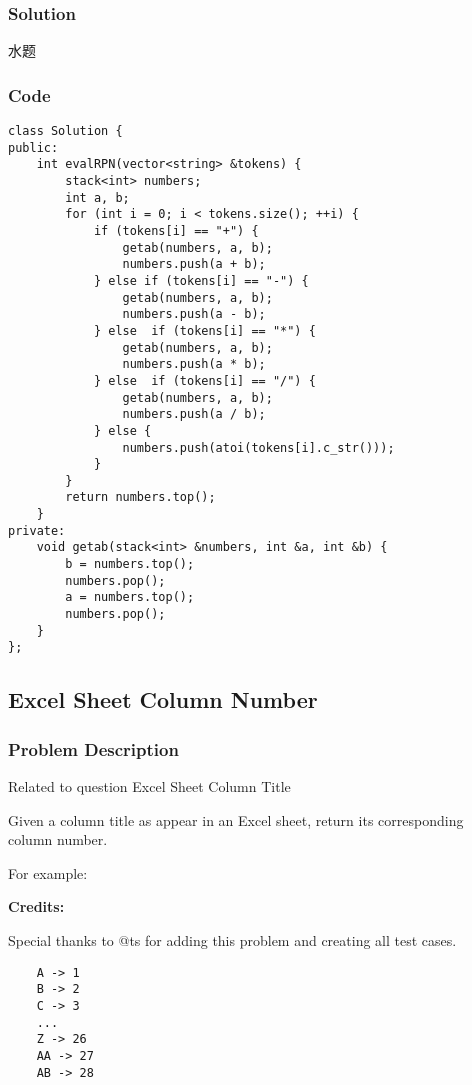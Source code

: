 \documentclass[courier]{article}
\begin{document}
\begin{CJK*}{UTF8}{gkai}
\subsubsection*{Solution}
水题

\subsubsection*{Code}
\begin{lstlisting}
class Solution {
public:
    int evalRPN(vector<string> &tokens) {
        stack<int> numbers;
        int a, b;
        for (int i = 0; i < tokens.size(); ++i) {
            if (tokens[i] == "+") {
                getab(numbers, a, b);
                numbers.push(a + b);
            } else if (tokens[i] == "-") {
                getab(numbers, a, b);
                numbers.push(a - b);
            } else  if (tokens[i] == "*") {
                getab(numbers, a, b);
                numbers.push(a * b);
            } else  if (tokens[i] == "/") {
                getab(numbers, a, b);
                numbers.push(a / b);
            } else {
                numbers.push(atoi(tokens[i].c_str()));
            }
        }
        return numbers.top();
    }
private:
    void getab(stack<int> &numbers, int &a, int &b) {
        b = numbers.top();
        numbers.pop();
        a = numbers.top();
        numbers.pop();
    }
}; 
\end{lstlisting}


\subsection{ Excel Sheet Column Number }

\subsubsection*{Problem Description}
Related to question Excel Sheet Column Title

Given a column title as appear in an Excel sheet, return its corresponding column number.

For example:

\textbf{Credits:}

Special thanks to @ts for adding this problem and creating all test cases.

\begin{verbatim}
    A -> 1
    B -> 2
    C -> 3
    ...
    Z -> 26
    AA -> 27
    AB -> 28 
\end{verbatim}



\end{CJK*}
\end{document}
